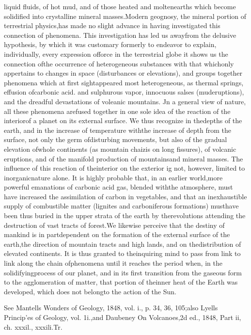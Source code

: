 liquid fluids, of hot mud, and of those heated and moltenearths which become solidified into crystalline mineral masses.Modern geognosy, the mineral portion of terrestrial physics,has made no slight advance in having investigated this connection of phenomena. This investigation has led us awayfrom the delusive hypothesis, by which it was customary formerly to endeavor to explain, individually, every expression offorce in the terrestrial globe  it shows us the connection ofthe occurrence of heterogeneous substances with that whichonly appertains to changes in space (disturbances or elevations), and groups together phenomena which at first sightappeared most heterogeneous, as thermal springs, effusion ofcarbonic acid. and sulphurous vapor, innocuous salses (muderuptions), and the dreadful devastations of voleanic mountains. Jn a general view of nature, all these phenomena arefused together in one sole idea of the reaction of the interiorof a planet on its external surface. We thus recognize in thedepths of the earth, and in the increase of temperature withthe increase of depth from the surface, not only the germ ofdisturbing movements, but also of the gradual elevation ofwhole continents (as mountain chaizis on long fissures), of volcanic eruptions, and of the manifold production of mountainsand mineral masses. The influence of this reaction of theinterior on the exterior ig not, however, limited to inorganicnature alone. It is highly probable that, in an earlier world,more powerful emanations of carbonic acid gas, blended withthe atmosphere, must have increased the assimilation of carbon in vegetables, and that an inexhaustible supply of combustible matter (lignites and carboniferous formations) musthave been thus buried in the upper strata of the earth by therevolutions attending the destruction of vast tracts of forest.We likewise perceive that the destiny of mankind is in partdependent on the formation of the external surface of the earth,the direction of mountain tracts and high lands, and on thedistribution of elevated continents. It is thus granted to theinquiring mind to pass from link to link along the chain ofphenomena until it reaches the period when, in the solidifyingprocess of our planet, and in its first transition from the gaseous form to the agglomeration of matter, that portion of theinner heat of the Earth was developed, which does not belongto the action of the Sun.

 See Mantells Wonders of Geology, 1848, vol. i., p. 34, 36, 105;also Lyells Princip'es of Geology, vol. 1i.,and Daubeney On Volcanoes,2d ed., 1848, Part ii, ch. xxxil., xxxili.Tr.

